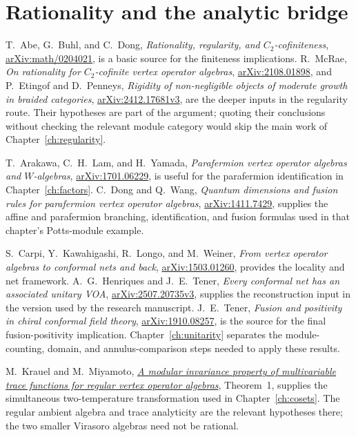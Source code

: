 \section*{Rationality and the analytic bridge}

T.~Abe, G.~Buhl, and C.~Dong,
\emph{Rationality, regularity, and $C_2$-cofiniteness},
\href{https://arxiv.org/abs/math/0204021}{arXiv:math/0204021},
is a basic source for the finiteness implications.
R.~McRae,
\emph{On rationality for $C_2$-cofinite vertex operator algebras},
\href{https://arxiv.org/abs/2108.01898}{arXiv:2108.01898},
and P.~Etingof and D.~Penneys,
\emph{Rigidity of non-negligible objects of moderate growth in
braided categories},
\href{https://arxiv.org/abs/2412.17681v3}{arXiv:2412.17681v3},
are the deeper inputs in the regularity route.
Their hypotheses are part of the argument; quoting their
conclusions without checking the relevant module category would
skip the main work of Chapter~\ref{ch:regularity}.

T.~Arakawa, C.~H.~Lam, and H.~Yamada,
\emph{Parafermion vertex operator algebras and $W$-algebras},
\href{https://arxiv.org/abs/1701.06229}{arXiv:1701.06229},
is useful for the parafermion identification in
Chapter~\ref{ch:factors}.
C.~Dong and Q.~Wang,
\emph{Quantum dimensions and fusion rules for parafermion vertex
operator algebras},
\href{https://arxiv.org/abs/1411.7429}{arXiv:1411.7429},
supplies the affine and parafermion branching, identification, and
fusion formulas used in that chapter's Potts-module example.

S.~Carpi, Y.~Kawahigashi, R.~Longo, and M.~Weiner,
\emph{From vertex operator algebras to conformal nets and back},
\href{https://arxiv.org/abs/1503.01260}{arXiv:1503.01260},
provides the locality and net framework.
A.~G.~Henriques and J.~E.~Tener,
\emph{Every conformal net has an associated unitary VOA},
\href{https://arxiv.org/abs/2507.20735v3}{arXiv:2507.20735v3},
supplies the reconstruction input in the version used by the
research manuscript. J.~E.~Tener,
\emph{Fusion and positivity in chiral conformal field theory},
\href{https://arxiv.org/abs/1910.08257}{arXiv:1910.08257},
is the source for the final fusion-positivity implication.
Chapter~\ref{ch:unitarity} separates the module-counting,
domain, and annulus-comparison steps needed to apply these results.

M.~Krauel and M.~Miyamoto,
\href{https://arxiv.org/abs/1501.00124}{\emph{A modular invariance
property of multivariable trace functions for regular vertex operator
algebras}}, Theorem~1, supplies the simultaneous two-temperature
transformation used in Chapter~\ref{ch:cosets}. The regular ambient
algebra and trace analyticity are the relevant hypotheses there;
the two smaller Virasoro algebras need not be rational.

